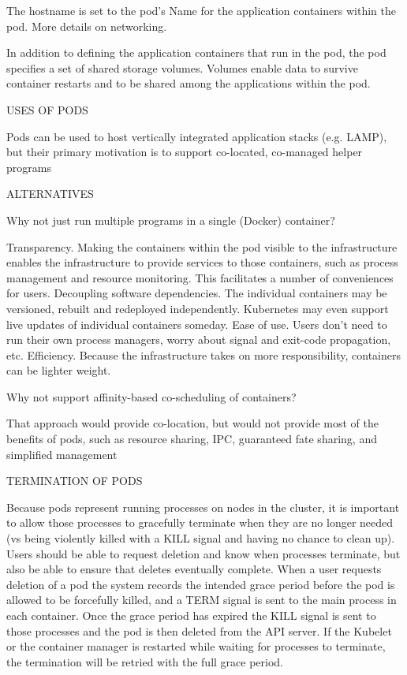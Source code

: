 The hostname is set to the pod’s Name for the application containers within the pod. More details on networking.

In addition to defining the application containers that run in the pod, the pod specifies a set of shared storage volumes. Volumes enable data to survive container restarts and to be shared among the applications within the pod.

USES OF PODS

Pods can be used to host vertically integrated application stacks (e.g. LAMP), but their primary motivation is to support co-located, co-managed helper programs

ALTERNATIVES

Why not just run multiple programs in a single (Docker) container?

Transparency. Making the containers within the pod visible to the infrastructure enables the infrastructure to provide services to those containers, such as process management and resource monitoring. This facilitates a number of conveniences for users.
Decoupling software dependencies. The individual containers may be versioned, rebuilt and redeployed independently. Kubernetes may even support live updates of individual containers someday.
Ease of use. Users don’t need to run their own process managers, worry about signal and exit-code propagation, etc.
Efficiency. Because the infrastructure takes on more responsibility, containers can be lighter weight.

Why not support affinity-based co-scheduling of containers?

That approach would provide co-location, but would not provide most of the benefits of pods, such as resource sharing, IPC, guaranteed fate sharing, and simplified management

TERMINATION OF PODS

Because pods represent running processes on nodes in the cluster, it is important to allow those processes to gracefully terminate when they are no longer needed (vs being violently killed with a KILL signal and having no chance to clean up). Users should be able to request deletion and know when processes terminate, but also be able to ensure that deletes eventually complete. When a user requests deletion of a pod the system records the intended grace period before the pod is allowed to be forcefully killed, and a TERM signal is sent to the main process in each container. Once the grace period has expired the KILL signal is sent to those processes and the pod is then deleted from the API server. If the Kubelet or the container manager is restarted while waiting for processes to terminate, the termination will be retried with the full grace period.

